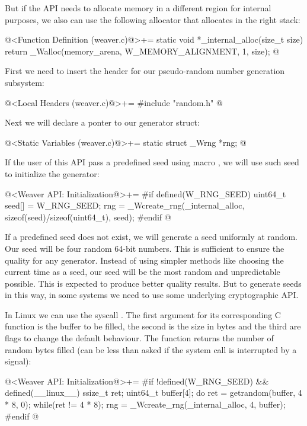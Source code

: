 But if the API needs to allocate memory in a different region for
internal purposes, we also can use the following allocator that
allocates in the right stack:

\iniciocodigo
@<Function Definition (weaver.c)@>+=
static void *_internal_alloc(size_t size){
  return _Walloc(memory_arena, W_MEMORY_ALIGNMENT, 1, size);
}
@
\fimcodigo


First we need to insert the header for our pseudo-random number
generation subsystem:

\iniciocodigo
@<Local Headers (weaver.c)@>+=
#include "random.h"
@
\fimcodigo

Next we will declare a ponter to our generator struct:

\iniciocodigo
@<Static Variables (weaver.c)@>+=
static struct _Wrng *rng;
@
\fimcodigo

If the user of this API pass a predefined seed using
macro , we will use such seed to initialize the
generator:

\iniciocodigo
@<Weaver API: Initialization@>+=
#if defined(W_RNG_SEED)
{
  uint64_t seed[] = W_RNG_SEED;
  rng = _Wcreate_rng(_internal_alloc, sizeof(seed)/sizeof(uint64_t),
                     seed);
}
#endif
@
\fimcodigo

If a predefined seed does not exist, we will generate a seed uniformly
at random. Our seed will be four random 64-bit numbers. This is
sufficient to ensure the quality for any generator. Instead of using
simpler methods like choosing the current time as a seed, our seed
will be the most random and unpredictable possible. This is expected
to produce better quality results. But to generate seeds in this way,
in some systems we need to use some underlying cryptographic API.

In Linux we can use the syscall . The first
argument for its corresponding C function is the buffer to be filled,
the second is the size in bytes and the third are flags to change the
default behaviour. The function returns the number of random bytes
filled (can be less than asked if the system call is interrupted by a
signal):

\iniciocodigo
@<Weaver API: Initialization@>+=
#if !defined(W_RNG_SEED) && defined(__linux__)
{
  ssize_t ret;
  uint64_t buffer[4];
  do{
    ret = getrandom(buffer, 4 * 8, 0);
  }while(ret != 4 * 8);
  rng = _Wcreate_rng(_internal_alloc, 4, buffer);
}
#endif
@
\fimcodigo

